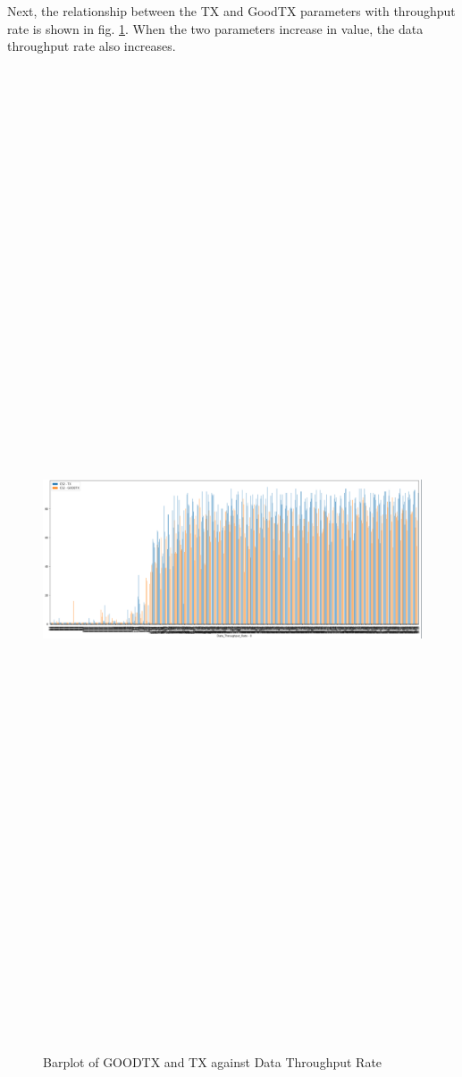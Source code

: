 Next, the relationship between the TX and GoodTX parameters with throughput rate is shown in fig. \ref{fig_bp2}. When the two parameters increase in value, the data throughput rate also increases.
\begin{figure} [ht]
    \centering
    \includegraphics[width=14.6cm,height=200.0cm,keepaspectratio]{pages/Chapter4/Chapter 4 Images/Bplot2.PNG}
    \caption{Barplot of GOODTX and TX against Data Throughput Rate}
    \label{fig_bp2}
\end{figure}

